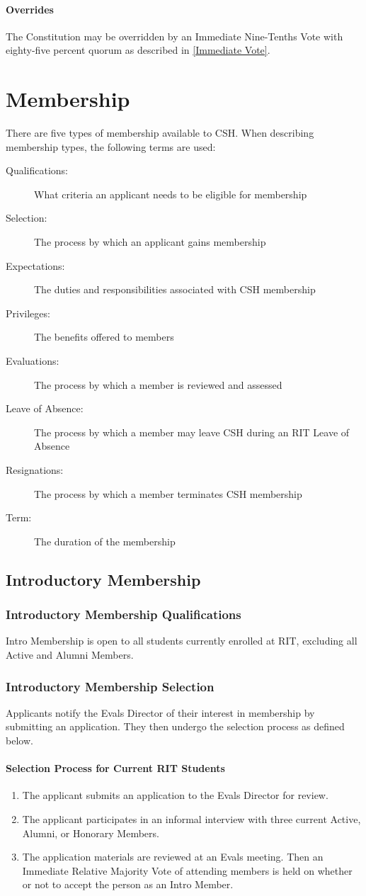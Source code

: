 \documentclass{article}
\newcommand{\article}[1]{\section{#1} \label{#1}}
\newcommand{\asection}[1]{\subsection{#1} \label{#1}}
\newcommand{\asubsection}[1]{\subsubsection{#1} \label{#1}}
\newcommand{\asubsubsection}[1]{\paragraph{#1} \label{#1}}
\begin{document}
\asubsubsection{Overrides}
The Constitution may be overridden by an Immediate Nine-Tenths Vote with eighty-five percent quorum as described in \ref{Immediate Vote}.

\article{Membership}
There are five types of membership available to CSH.
When describing membership types, the following terms are used:
\begin{description}
	\item[Qualifications:] What criteria an applicant needs to be eligible for membership
	\item[Selection:] The process by which an applicant gains membership
	\item[Expectations:] The duties and responsibilities associated with CSH membership
	\item[Privileges:] The benefits offered to members
	\item[Evaluations:] The process by which a member is reviewed and assessed
	\item[Leave of Absence:] The process by which a member may leave CSH during an RIT Leave of Absence
	\item[Resignations:] The process by which a member terminates CSH membership
	\item[Term:] The duration of the membership
\end{description}

\asection{Introductory Membership}

\asubsection{Introductory Membership Qualifications}
Intro Membership is open to all students currently enrolled at RIT, excluding all Active and Alumni Members.

\asubsection{Introductory Membership Selection}
Applicants notify the Evals Director of their interest in membership by submitting an application.
They then undergo the selection process as defined below.

\asubsubsection{Selection Process for Current RIT Students}
\renewcommand{\theenumi}{\arabic{enumi}} %
\begin{enumerate}
	\item The applicant submits an application to the Evals Director for review.
	\item The applicant participates in an informal interview with three current Active, Alumni, or Honorary Members.
	\item The application materials are reviewed at an Evals meeting.
	      Then an Immediate Relative Majority Vote of attending members is held on whether or not to accept the person as an Intro Member.
\end{enumerate}
\end{document}
